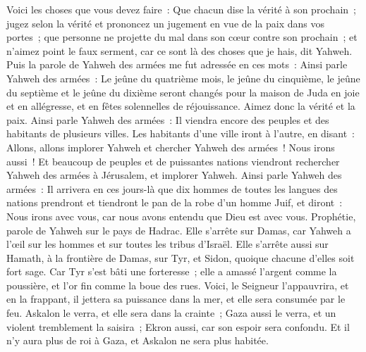 \begin{multicols}{2}
Voici les choses que vous devez faire~: Que chacun dise la vérité à son prochain~; jugez selon la vérité et prononcez un jugement en vue de la paix dans vos portes~;
que personne ne projette du mal dans son cœur contre son prochain~; et n'aimez point le faux serment, car ce sont là des choses que je hais, dit Yahweh.
Puis la parole de Yahweh des armées me fut adressée en ces mots~:
Ainsi parle Yahweh des armées~: Le jeûne du quatrième mois, le jeûne du cinquième, le jeûne du septième et le jeûne du dixième seront changés pour la maison de Juda en joie et en allégresse, et en fêtes solennelles de réjouissance. Aimez donc la vérité et la paix.
Ainsi parle Yahweh des armées~: Il viendra encore des peuples et des habitants de plusieurs villes.
Les habitants d'une ville iront à l'autre, en disant~: Allons, allons implorer Yahweh et chercher Yahweh des armées~! Nous irons aussi~!
Et beaucoup de peuples et de puissantes nations viendront rechercher Yahweh des armées à Jérusalem, et implorer Yahweh.
Ainsi parle Yahweh des armées~: Il arrivera en ces jours-là que dix hommes de toutes les langues des nations prendront et tiendront le pan de la robe d'un homme Juif, et diront~: Nous irons avec vous, car nous avons entendu que Dieu est avec vous.
\VerseOne{}Prophétie, parole de Yahweh sur le pays de Hadrac. Elle s'arrête sur Damas, car Yahweh a l'œil sur les hommes et sur toutes les tribus d'Israël.
Elle s'arrête aussi sur Hamath, à la frontière de Damas, sur Tyr, et Sidon, quoique chacune d'elles soit fort sage.
Car Tyr s'est bâti une forteresse~; elle a amassé l'argent comme la poussière, et l'or fin comme la boue des rues.
Voici, le Seigneur l'appauvrira, et en la frappant, il jettera sa puissance dans la mer, et elle sera consumée par le feu.
Askalon le verra, et elle sera dans la crainte~; Gaza aussi le verra, et un violent tremblement la saisira~; Ekron aussi, car son espoir sera confondu. Et il n'y aura plus de roi à Gaza, et Askalon ne sera plus habitée.

\end{multicols}
